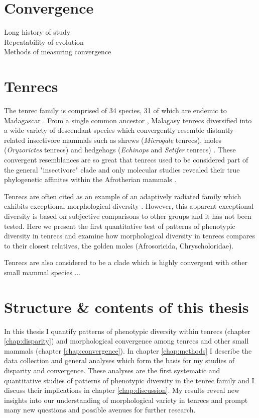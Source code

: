 \section{Convergence}
Long history of study\\
Repeatability of evolution\\
Methods of measuring convergence

\section{Tenrecs}
	
	The tenrec family is comprised of 34 species, 31 of which are endemic to Madagascar \citep{Olson2013}. From a single common ancestor \citep{Asher2006}, Malagasy tenrecs diversified into a wide variety of descendant species which convergently resemble distantly related insectivore mammals such as shrews (\textit{Microgale} tenrecs), moles (\textit{Oryzorictes} tenrecs) and hedgehogs (\textit{Echinops} and \textit{Setifer} tenrecs) \citep{Eisenberg1969}. These convergent resemblances are so great that tenrecs used to be considered part of the general "insectivore" clade and only molecular studies revealed their true phylogenetic affinites within the Afrotherian mammals \citep{Stanhope1998}.  
	

	Tenrecs are often cited as an example of an adaptively radiated family which exhibits exceptional morphological diversity \citep{Soarimalala2011, Olson2003, Eisenberg1969}. However, this apparent exceptional diversity is based on subjective comparisons to other groups and it has not been tested. Here we present the first quantitative test of patterns of phenotypic diversity in tenrecs and examine how morphological diversity in tenrecs compares to their closest relatives, the golden moles (Afrosoricida, Chryscholoridae). 
	

	
	Tenrecs are also considered to be a clade which is highly convergent with other small mammal species ...

\section{Structure \& contents of this thesis}
	
	In this thesis I quantify patterns of phenotypic diversity within tenrecs (chapter \ref {chap:disparity}) and morphological convergence among tenrecs and other small mammals (chapter \ref {chap:convergence}). In chapter \ref {chap:methods} I describe the data collection and general analyses which form the basis for my studies of disparity and convergence.  These analyses are the first systematic and quantitative studies of patterns of phenotypic diversity in the tenrec family and I discuss their implications in chapter \ref{chap:discussion}.	
 	My results reveal new insights into our understanding of morphological variety in tenrecs and prompt many new questions and possible avenues for further research.


